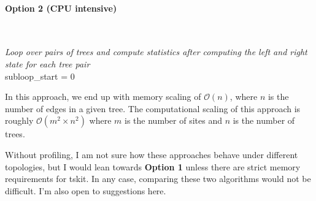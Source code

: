 \documentclass[12pt]{article}
\begin{document}
\paragraph{Option 2 (CPU intensive)}
\mbox{} \\
\begin{algorithm}[H]

  \emph{Loop over pairs of trees and compute statistics after computing the left
  and right state for each tree pair} \\
  subloop\_start = 0 \\
  
\end{algorithm}

In this approach, we end up with memory scaling of $\mathcal{O}(n)$, where $n$
is the number of edges in a given tree. The computational scaling of this
approach is roughly $\mathcal{O}({m}^{2} \times {n}^{2})$ where $m$ is
the number of sites and $n$ is the number of trees.

Without profiling, I am not sure how these approaches behave under different
topologies, but I would lean towards \textbf{Option 1} unless there are strict
memory requirements for tskit. In any case, comparing these two algorithms would
not be difficult. I'm also open to suggestions here.
\end{document}

